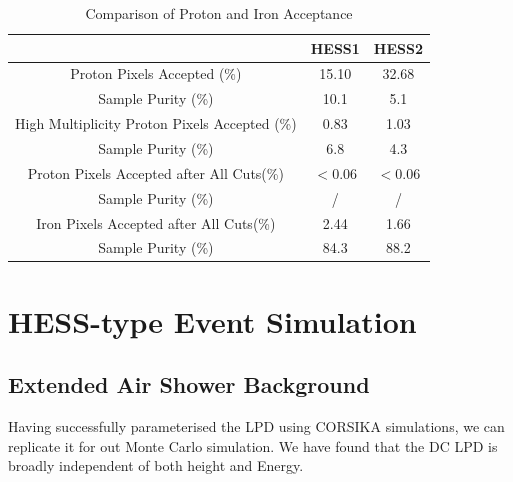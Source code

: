 \documentclass{article}
\begin{document}
\begin{table}[h!]
  \centering
  \caption{Comparison of Proton and Iron Acceptance}
  \label{tab:protonacceptance}
  \begin{tabular}{ccc}
    \toprule
    & HESS1  & HESS2 \\
    \midrule
    Proton Pixels Accepted (\%) & 15.10 & 32.68\\
    Sample Purity (\%) & 10.1 & 5.1 \\
    \midrule
    High Multiplicity Proton Pixels Accepted (\%) & 0.83 & 1.03\\
    Sample Purity (\%) & 6.8 & 4.3 \\
    \midrule
    Proton Pixels Accepted after All Cuts(\%) & $< 0.06$ & $< 0.06$\\
    Sample Purity (\%) & / & / \\
    \midrule
    Iron Pixels Accepted after All Cuts(\%) & 2.44 & 1.66\\
    Sample Purity (\%) & 84.3 & 88.2 \\
    \bottomrule
  \end{tabular}
\end{table}

\section{HESS-type Event Simulation}

\subsection{Extended Air Shower Background}
Having successfully parameterised the LPD using CORSIKA simulations, we can replicate it for out Monte Carlo simulation. We have found that the DC LPD is broadly independent of both height and Energy. 
\end{document}
